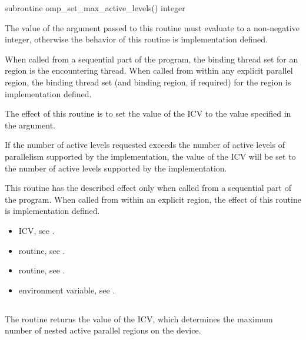 \begin{fortranspecific}
\begin{ompfSubroutine}
subroutine omp_set_max_active_levels()
integer 
\end{ompfSubroutine}
\end{fortranspecific}

\constraints
The value of the argument passed to this routine must evaluate to a 
non-negative integer, otherwise the behavior of this routine is 
implementation defined.

\binding
When called from a sequential part of the program, the binding thread 
set for an  region is the encountering 
thread. When called from within any explicit parallel region, the binding 
thread set (and binding region, if required) for the 
 region is implementation defined.

\effect
The effect of this routine is to set the value of the 
 ICV to the value specified in the argument.

If the number of active levels requested exceeds the number of active 
levels of parallelism supported by the implementation, the value of the 
 ICV will be set to the number of active 
levels supported by the implementation.

This routine has the described effect only when called from a sequential 
part of the program. When called from within an explicit  
region, the effect of this routine is implementation defined.

\crossreferences
\begin{itemize}
\item {} ICV, see
.

\item {} routine, see
.

\item {} routine, see
.

\item {} environment variable, see
.
\end{itemize}



\subsection{}
\label{subsec:omp_get_max_active_levels}
\summary
The  routine returns the value of the
 ICV, which determines the maximum number 
of nested active parallel regions on the device.

